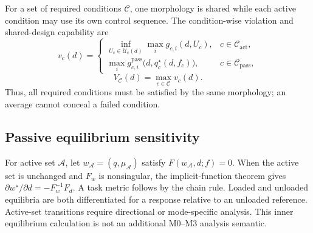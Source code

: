 For a set of required conditions $\mathcal C$, one morphology is shared while each active condition may use its own control sequence. The condition-wise violation and shared-design capability are
\begin{equation}
v_c(d)=
\begin{cases}
\displaystyle\inf_{U_c\in\mathcal U_c(d)}
\max_i g_{c,i}(d,U_c), & c\in\mathcal C_{\mathrm{act}},\\[0.8em]
\displaystyle\max_i g^{\mathrm{pass}}_{c,i}
\bigl(d,q^\star_c(d,f_c)\bigr), & c\in\mathcal C_{\mathrm{pass}},
\end{cases}
\label{eq:condition-violation}
\end{equation}
\begin{equation}
V_{\mathcal C}(d)=\max_{c\in\mathcal C}v_c(d).
\label{eq:multi-capability}
\end{equation}
Thus, all required conditions must be satisfied by the same morphology; an average cannot conceal a failed condition.

\subsection{Passive equilibrium sensitivity}
For active set $\mathcal A$, let $w_{\mathcal A}=(q,\mu_{\mathcal A})$ satisfy $F(w_{\mathcal A},d;f)=0$. When the active set is unchanged and $F_w$ is nonsingular, the implicit-function theorem gives $\partial w^\star/\partial d=-F_w^{-1}F_d$. A task metric follows by the chain rule. Loaded and unloaded equilibria are both differentiated for a response relative to an unloaded reference. Active-set transitions require directional or mode-specific analysis. This inner equilibrium calculation is not an additional M0--M3 analysis semantic.

